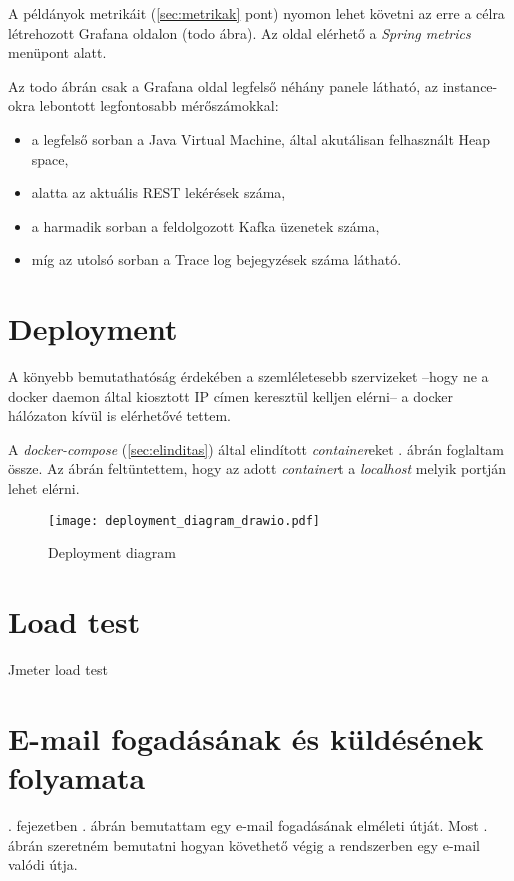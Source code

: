 A példányok metrikáit (\ref{sec:metrikak} pont) nyomon lehet követni az erre a célra létrehozott Grafana oldalon (todo ábra). Az oldal elérhető a  \textit{Spring metrics} menüpont alatt.

Az todo ábrán csak a Grafana oldal legfelső néhány panele látható, az instance-okra lebontott legfontosabb mérőszámokkal:

\begin{itemize}
	\item a legfelső sorban a Java Virtual Machine, által akutálisan felhasznált Heap space,	
	\item alatta az aktuális REST lekérések száma,
	\item a harmadik sorban a feldolgozott Kafka üzenetek száma,
	\item míg az utolsó sorban a Trace log bejegyzések száma látható.
\end{itemize}


\section{Deployment}
A könyebb bemutathatóság érdekében a szemléletesebb szervizeket --hogy ne a docker daemon által kiosztott IP címen keresztül kelljen elérni-- a docker hálózaton kívül is elérhetővé tettem. 

A \textit{docker-compose} (\ref{sec:elinditas}) által elindított \textit{container}eket . ábrán foglaltam össze. Az ábrán feltüntettem, hogy az adott \textit{container}t a \textit{localhost} melyik portján lehet elérni.


\begin{figure}[hbt] 
	\centering
	\texttt{[image: deployment\_diagram\_drawio.pdf]}
	\caption[Deployment diagram]{Deployment diagram}
	\label{fig:deployment_diagram}
\end{figure}


\section{Load test}
Jmeter load test

\section{E-mail fogadásának és küldésének folyamata}
. fejezetben . ábrán bemutattam egy e-mail fogadásának elméleti útját. Most . ábrán szeretném bemutatni hogyan követhető végig a rendszerben egy e-mail valódi útja.

